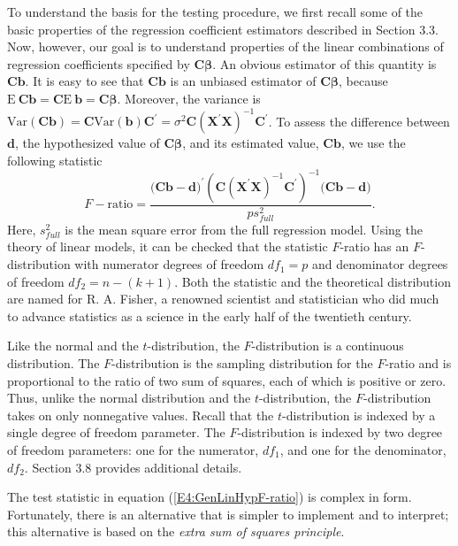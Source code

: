 To understand the basis for the testing procedure, we first recall
some of the basic properties of the regression coefficient
estimators described in Section 3.3. Now, however, our goal is to
understand properties of the linear combinations of regression
coefficients specified by $\mathbf{C\boldsymbol \beta } $. An
obvious estimator of this quantity is $\mathbf{Cb}$. It is easy to
see that $\mathbf{Cb}$ is an unbiased estimator of
$\mathbf{C\boldsymbol \beta }$, because $
\mathrm{E~}\mathbf{Cb=C}\mathrm{E~}\mathbf{b=C\boldsymbol \beta }$.
Moreover, the
variance is $\mathrm{Var}\left( \mathbf{Cb}\right) \mathbf{=C}\mathrm{Var}%
\left( \mathbf{b}\right) \mathbf{C}^{\prime}=\sigma
^2\mathbf{C}\left( \mathbf{X^{\prime}X}\right)
^{-1}\mathbf{C}^{\prime}$. To assess the difference between
$\mathbf{d}$, the hypothesized value of $\mathbf{C \boldsymbol \beta
}$, and its estimated value, $\mathbf{Cb}$, we use the following
statistic
\begin{equation}\label{E4:GenLinHypF-ratio}
F-\textrm{ratio}=\frac{(\mathbf{Cb-d)}^{\prime}\left(
\mathbf{C}\left( \mathbf{X^{\prime}X} \right)
^{-1}\mathbf{C}^{\prime}\right) ^{-1}(\mathbf{Cb-d)}}{ps_{full}^2}.
\end{equation}
Here, $s_{full}^2$ is the mean square error from the full regression
model. Using the theory of linear models, it can be checked that the
statistic $F$-ratio has an $F$-distribution with numerator degrees
of freedom $df_1=p$ and denominator degrees of freedom
$df_2=n-(k+1)$. Both the statistic and the theoretical distribution
are named for R. A. Fisher, a renowned scientist and statistician
who did much to advance statistics as a science in the early half of
the twentieth century.

Like the normal and the $t$-distribution, the $F$-distribution is a
continuous distribution. The $F$-distribution is the sampling
distribution for the $F$-ratio and is proportional to the ratio of
two sum of squares, each of which is positive or zero. Thus, unlike
the normal distribution and the $t$-distribution, the
$F$-distribution takes on only nonnegative values. Recall that the
$t$-distribution is indexed by a single degree of freedom parameter.
The $F$-distribution is indexed by two degree of freedom
parameters: one for the numerator, $df_1$, and one for the denominator, $%
df_2$. Section 3.8 provides additional details.

The test statistic in equation (\ref{E4:GenLinHypF-ratio}) is
complex in form. Fortunately, there is an alternative that is
simpler to implement and to interpret; this alternative is based on
the \emph{extra sum of squares principle}.

